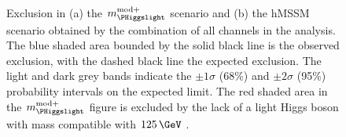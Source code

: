 \begin{figure}[h!]
\begin{center}
~\\
\end{center}
\caption[Exclusion in the $m_{\PHiggslight}^{\text{mod+}}$ scenario and the hMSSM
scenario of the \AHtotautau analysis.]{Exclusion in (a) the $m_{\PHiggslight}^{\text{mod}+}$ scenario and (b) the hMSSM scenario 
obtained by the combination
of all channels in the \AHtotautau analysis. The blue shaded area bounded by the 
solid black line is the observed exclusion, with the dashed black line the
expected exclusion. The light and dark grey bands indicate
the $\pm 1\sigma$ (68\%) and $\pm 2\sigma$ (95\%) probability intervals on the expected limit.
The red shaded area in the $m_{\PHiggslight}^{\text{mod}+}$ figure
is excluded by the lack of a light Higgs boson with mass compatible with $125\,\GeV$ \cite{CMS-PAS-HIG-16-037}.}
\label{fig:mssm_mhmodp_2016}
\end{figure}

